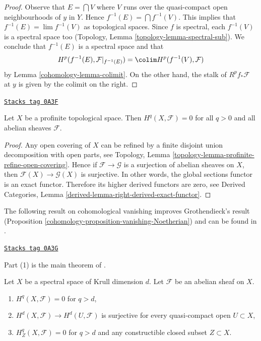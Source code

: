 \begin{proof}

Observe that $E = \bigcap V$ where $V$ runs over the quasi-compact
open neighbourhoods of $y$ in $Y$. Hence $f^{-1}(E) = \bigcap f^{-1}(V)$.
This implies that $f^{-1}(E) = \lim f^{-1}(V)$ as topological spaces.
Since $f$ is spectral, each $f^{-1}(V)$ is a spectral space too
(Topology, Lemma \ref{topology-lemma-spectral-sub}).
We conclude that $f^{-1}(E)$ is a spectral space and that
$$
H^p(f^{-1}(E), \mathcal{F}|_{f^{-1}(E)}) =
\colim H^p(f^{-1}(V), \mathcal{F})
$$
by Lemma \ref{cohomology-lemma-colimit}. On the other hand, the stalk of
$R^pf_*\mathcal{F}$ at $y$ is given by the colimit on the right.
\end{proof}

\begin{lemma}
\label{cohomology-lemma-vanishing-for-profinite}
\href{https://stacks.math.columbia.edu/tag/0A3F}{\texttt{Stacks tag 0A3F}}

Let $X$ be a profinite topological space. Then $H^q(X, \mathcal{F}) = 0$
for all $q > 0$ and all abelian sheaves $\mathcal{F}$.
\end{lemma}

\begin{proof}
Any open covering of $X$ can be refined by a finite disjoint union
decomposition with open parts, see
Topology, Lemma \ref{topology-lemma-profinite-refine-open-covering}.
Hence if $\mathcal{F} \to \mathcal{G}$ is a surjection of abelian
sheaves on $X$, then $\mathcal{F}(X) \to \mathcal{G}(X)$ is surjective.
In other words, the global sections functor is an exact functor.
Therefore its higher derived functors are zero, see
Derived Categories, Lemma \ref{derived-lemma-right-derived-exact-functor}.
\end{proof}

The following result on cohomological vanishing
improves Grothendieck's result
(Proposition \ref{cohomology-proposition-vanishing-Noetherian})
and can be found in \cite{Scheiderer}.

\begin{proposition}
\label{cohomology-proposition-cohomological-dimension-spectral}
\href{https://stacks.math.columbia.edu/tag/0A3G}{\texttt{Stacks tag 0A3G}}

\begin{reference}
Part (1) is the main theorem of \cite{Scheiderer}.
\end{reference}
Let $X$ be a spectral space of Krull dimension $d$.
Let $\mathcal{F}$ be an abelian sheaf on $X$.
\begin{enumerate}
\item $H^q(X, \mathcal{F}) = 0$ for $q > d$,
\item $H^d(X, \mathcal{F}) \to H^d(U, \mathcal{F})$ is surjective
for every quasi-compact open $U \subset X$,
\item $H^q_Z(X, \mathcal{F}) = 0$ for $q > d$ and any constructible
closed subset $Z \subset X$.
\end{enumerate}
\end{proposition}

